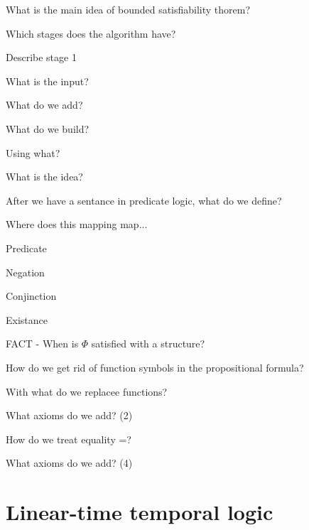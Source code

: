 \documentclass[fleqn]{article}
\begin{document}
\begin{enumerate}
    \item What is the main idea of bounded satisfiability thorem?
    \item Which stages does the algorithm have?
    \item Describe stage 1
    \begin{itemize}
        {\color{blue}\item What is the input?}
        {\color{red}\item What do we add?}
        {\color{green}\item What do we build?}
        {\color{green}\item Using what?}
        {\color{green}\item What is the idea?}
    \end{itemize}
    {\color{red}\item After we have a sentance in predicate logic, what do we define?}
    \item Where does this mapping map...
    \begin{itemize}
        {\color{green}\item Predicate}
        {\color{red}\item Negation}
        \item Conjinction
        {\color{blue}\item Existance}
    \end{itemize}
    {\color{red}\item FACT - When is $\Phi$ satisfied with a structure?}
    {\color{green}\item How do we get rid of function symbols in the propositional formula?}
    \begin{itemize}
        {\color{green}\item With what do we replacee functions?}
        {\color{green}\item What axioms do we add? (2)}
    \end{itemize}
    {\color{red}\item How do we treat equality =?}
    \begin{itemize}
        {\color{red}\item What axioms do we add? (4)}
    \end{itemize}
\end{enumerate}


\section{Linear-time temporal logic}
\end{document}
